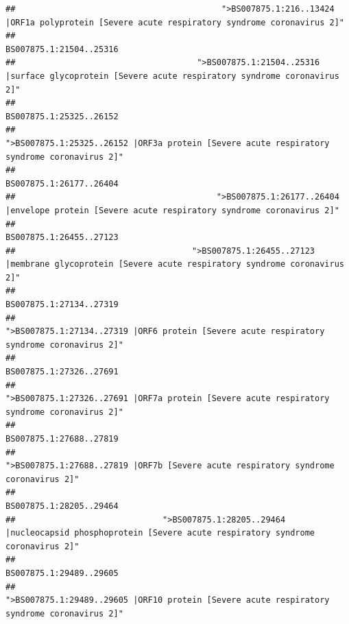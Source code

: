 \documentclass[
]{article}
\begin{document}
\begin{verbatim}
##                                          ">BS007875.1:216..13424 |ORF1a polyprotein [Severe acute respiratory syndrome coronavirus 2]" 
##                                                                                                                BS007875.1:21504..25316 
##                                     ">BS007875.1:21504..25316 |surface glycoprotein [Severe acute respiratory syndrome coronavirus 2]" 
##                                                                                                                BS007875.1:25325..26152 
##                                            ">BS007875.1:25325..26152 |ORF3a protein [Severe acute respiratory syndrome coronavirus 2]" 
##                                                                                                                BS007875.1:26177..26404 
##                                         ">BS007875.1:26177..26404 |envelope protein [Severe acute respiratory syndrome coronavirus 2]" 
##                                                                                                                BS007875.1:26455..27123 
##                                    ">BS007875.1:26455..27123 |membrane glycoprotein [Severe acute respiratory syndrome coronavirus 2]" 
##                                                                                                                BS007875.1:27134..27319 
##                                             ">BS007875.1:27134..27319 |ORF6 protein [Severe acute respiratory syndrome coronavirus 2]" 
##                                                                                                                BS007875.1:27326..27691 
##                                            ">BS007875.1:27326..27691 |ORF7a protein [Severe acute respiratory syndrome coronavirus 2]" 
##                                                                                                                BS007875.1:27688..27819 
##                                                    ">BS007875.1:27688..27819 |ORF7b [Severe acute respiratory syndrome coronavirus 2]" 
##                                                                                                                BS007875.1:28205..29464 
##                              ">BS007875.1:28205..29464 |nucleocapsid phosphoprotein [Severe acute respiratory syndrome coronavirus 2]" 
##                                                                                                                BS007875.1:29489..29605 
##                                            ">BS007875.1:29489..29605 |ORF10 protein [Severe acute respiratory syndrome coronavirus 2]" 

\end{verbatim}
\end{document}
